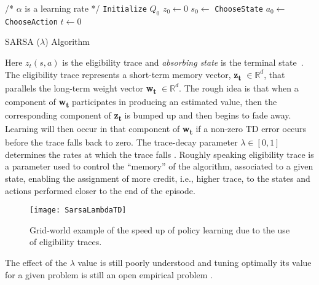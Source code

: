 \begin{algorithm}
	/* $\alpha$ is a learning rate */ \;
	{\tt Initialize} $Q_0$ \;
	$z_0 \leftarrow 0$ \;
	$s_0 \leftarrow$ {\tt ChooseState} \;
	$a_0 \leftarrow$ {\tt ChooseAction} \;
	$t \leftarrow 0$ \;
\caption{SARSA ($\lambda$) Algorithm \cite{Sigaud:2010:MDP:1841781}}
\label{SarsaLambdaAlgo} 
\end{algorithm}

Here $z_t(s, a)$  is the eligibility trace and \textit{absorbing state} is the terminal state~\cite{Sigaud:2010:MDP:1841781}. The eligibility trace represents a short-term memory vector, \textbf{z\textsubscript{t}} $\in \mathbb{R}^d$, that parallels the long-term weight vector \textbf{w\textsubscript{t}} $\in \mathbb{R}^d$. The rough idea is that when a component of \textbf{w\textsubscript{t}} participates in producing an estimated value, then the  corresponding component of \textbf{z\textsubscript{t}} is bumped up and then begins to fade away. Learning will then occur in that component of \textbf{w\textsubscript{t}} if a non-zero TD error occurs before the trace falls back to zero. The trace-decay parameter $\lambda \in [0, 1]$ determines the rates at which the trace falls \cite{SuttonBarto}. Roughly speaking eligibility trace is a parameter used to control the “memory” of the algorithm, associated to a given state, enabling the assignment of more credit, i.e., higher trace, to the states and actions performed closer to the end of the episode.

\begin{figure}[h!]
	\centering
	\texttt{[image: SarsaLambdaTD]}
	\caption{Grid-world example of the speed up of policy learning due to the use of eligibility traces.}
	\label{fig:SarsaLambdaTD}
\end{figure}

The effect of the $\lambda$ value is still poorly understood and tuning optimally its value for a given problem is still an open empirical problem \cite{Sigaud:2010:MDP:1841781}.


